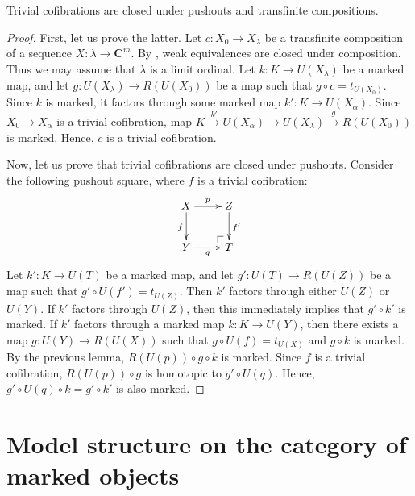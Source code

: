 \documentclass[reqno]{amsart}
\makeatletter
\theoremstyle{definition}
\theoremstyle{remark}
\newcommand{\cat}[1]{\mathbf{#1}}
\newcommand{\C}{\cat{C}}
\numberwithin{figure}{section}
\newcommand{\po}[1][dr]{\save*!/#1+1.2pc/#1:(1,-1)@^{|-}\restore}
\makeatother
\begin{document}
\begin{prop}
Trivial cofibrations are closed under pushouts and transfinite compositions.
\end{prop}
\begin{proof}
First, let us prove the latter.
Let $c : X_0 \to X_\lambda$ be a transfinite composition of a sequence $X : \lambda \to \C^m$.
By , weak equivalences are closed under composition.
Thus we may assume that $\lambda$ is a limit ordinal.
Let $k : K \to U(X_\lambda)$ be a marked map, and let $g : U(X_\lambda) \to R(U(X_0))$ be a map such that $g \circ c = t_{U(X_0)}$.
Since $k$ is marked, it factors through some marked map $k' : K \to U(X_\alpha)$.
Since $X_0 \to X_\alpha$ is a trivial cofibration, map $K \xrightarrow{k'} U(X_\alpha) \to U(X_\lambda) \xrightarrow{g} R(U(X_0))$ is marked.
Hence, $c$ is a trivial cofibration.

Now, let us prove that trivial cofibrations are closed under pushouts.
Consider the following pushout square, where $f$ is a trivial cofibration:
\[ \xymatrix{ X \ar[r]^p \ar[d]_f & Z \ar[d]^{f'} \\
              Y \ar[r]_q & \po T
            } \]
Let $k' : K \to U(T)$ be a marked map, and let $g' : U(T) \to R(U(Z))$ be a map such that $g' \circ U(f') = t_{U(Z)}$.
Then $k'$ factors through either $U(Z)$ or $U(Y)$.
If $k'$ factors through $U(Z)$, then this immediately implies that $g' \circ k'$ is marked.
If $k'$ factors through a marked map $k : K \to U(Y)$, then there exists a map $g : U(Y) \to R(U(X))$ such that $g \circ U(f) = t_{U(X)}$ and $g \circ k$ is marked.
By the previous lemma, $R(U(p)) \circ g \circ k$ is marked.
Since $f$ is a trivial cofibration, $R(U(p)) \circ g$ is homotopic to $g' \circ U(q)$.
Hence, $g' \circ U(q) \circ k = g' \circ k'$ is also marked.
\end{proof}

\section{Model structure on the category of marked objects}
\label{sec:model-structure}
\end{document}

